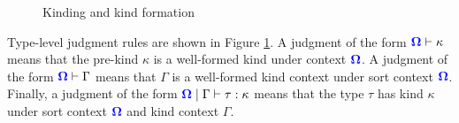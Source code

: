 \documentclass[sigplan,10pt,review,anonymous]{acmart}
\newcommand{\blu}[1]{\textbf{\color{blue}{#1}}}
\newcommand{\blum}[1]{\mathbf{\color{blue}{#1}}}
\begin{document}
\begin{figure}
\caption{Kinding and kind formation}
\label{fig:kinding}
\end{figure}

Type-level judgment rules are shown in Figure \ref{fig:kinding}. A judgment of the form $\blum{\Omega} \vdash \kappa$ means that the pre-kind $\kappa$ is a well-formed kind under context $\blum{\Omega}$. A judgment of the form $\blum{\Omega} \vdash \Gamma$ means that $\Gamma$ is a well-formed kind context under sort context $\blum{\Omega}$. Finally, a judgment of the form $\blum{\Omega} \mid \Gamma \vdash \tau : \kappa$ means that the type $\tau$ has kind $\kappa$ under sort context $\blum{\Omega}$ and kind context $\Gamma$.
\end{document}
